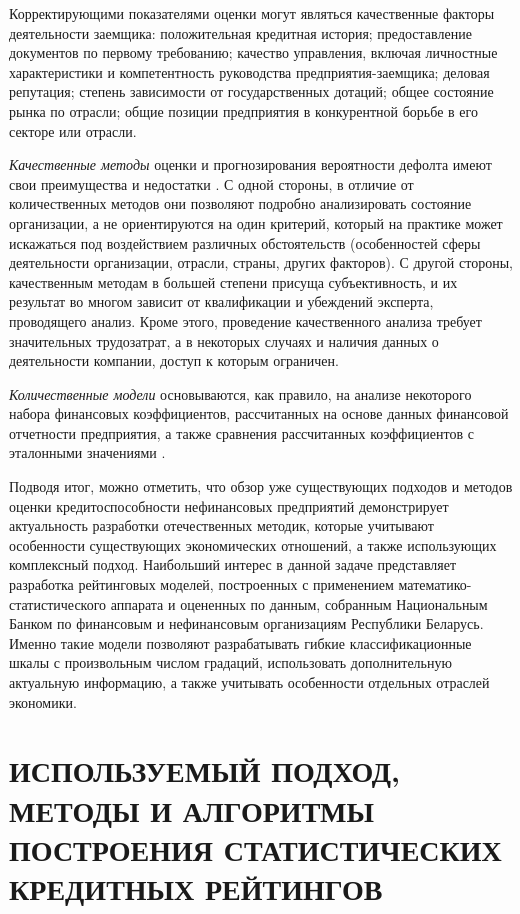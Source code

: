 \documentclass[14pt,a4paper]{extarticle}
\begin{document}
Корректирующими показателями оценки могут являться качественные факторы деятельности заемщика: 
положительная кредитная история; предоставление документов по первому требованию; качество управления, 
включая личностные характеристики и компетентность руководства предприятия-заемщика; деловая репутация; 
степень зависимости от государственных дотаций; общее состояние рынка по отрасли; общие позиции 
предприятия в конкурентной борьбе в его секторе или отрасли.

\textit{Качественные методы} оценки и прогнозирования вероятности дефолта имеют свои преимущества и 
недостатки \cite{blank2005}. С одной стороны, в отличие от количественных методов они позволяют подробно 
анализировать состояние организации, а не ориентируются на один критерий, который на практике может 
искажаться под воздействием различных обстоятельств (особенностей сферы деятельности организации, отрасли, 
страны, других факторов). С другой стороны, качественным методам в большей степени присуща субъективность, 
и их результат во многом зависит от квалификации и убеждений эксперта, проводящего анализ. Кроме этого, 
проведение качественного анализа требует значительных трудозатрат, а в некоторых случаях и наличия данных 
о деятельности компании, доступ к которым ограничен.

\textit{Количественные модели} основываются, как правило, на анализе некоторого набора финансовых 
коэффициентов, рассчитанных на основе данных финансовой отчетности предприятия, а также сравнения 
рассчитанных коэффициентов с эталонными значениями \cite{savitskaya2008, falcon2007}.

Подводя итог, можно отметить, что обзор уже существующих подходов и методов оценки кредитоспособности 
нефинансовых предприятий демонстрирует актуальность разработки отечественных методик, которые учитывают 
особенности существующих экономических отношений, а также использующих комплексный подход. Наибольший 
интерес в данной задаче представляет разработка рейтинговых моделей, построенных с применением 
математико-статистического аппарата и оцененных по данным, собранным Национальным Банком по финансовым 
и нефинансовым организациям Республики Беларусь. Именно такие модели позволяют разрабатывать гибкие 
классификационные шкалы с произвольным числом градаций, использовать дополнительную актуальную информацию, 
а также учитывать особенности отдельных отраслей экономики.

\clearpage

\section{ИСПОЛЬЗУЕМЫЙ ПОДХОД, МЕТОДЫ И АЛГОРИТМЫ ПОСТРОЕНИЯ СТАТИСТИЧЕСКИХ КРЕДИТНЫХ РЕЙТИНГОВ}
\end{document}
